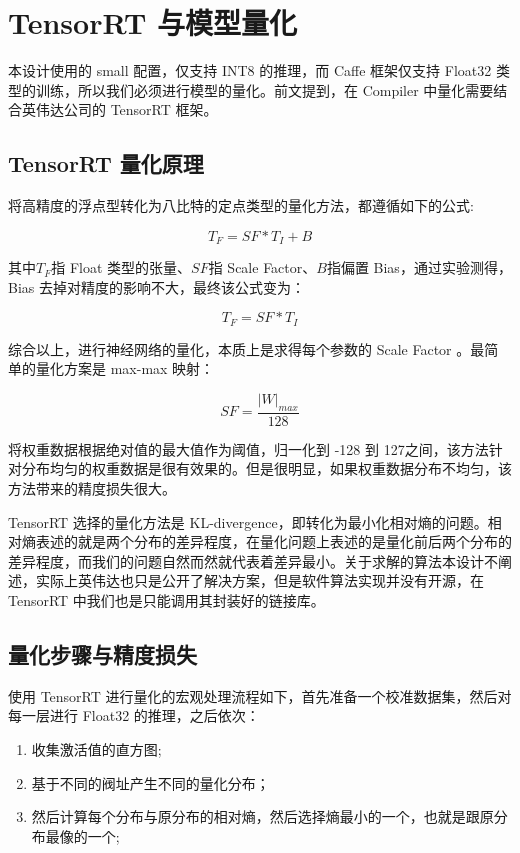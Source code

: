 \section{TensorRT 与模型量化}

本设计使用的 small 配置，仅支持 INT8 的推理，而 Caffe 框架仅支持 Float32 类型的训练，所以我们必须进行模型的量化。前文提到，在 Compiler 中量化需要结合英伟达公司的 TensorRT 框架。

\subsection{TensorRT 量化原理}

将高精度的浮点型转化为八比特的定点类型的量化方法，都遵循如下的公式:

$$ T_F = SF * T_I + B $$


其中$T_F$指 Float 类型的张量、$SF$指 Scale Factor、$B$指偏置 Bias，通过实验测得，Bias 去掉对精度的影响不大，最终该公式变为：

$$ T_F = SF * T_I $$

综合以上，进行神经网络的量化，本质上是求得每个参数的 Scale Factor 。最简单的量化方案是 max-max 映射：

$$ SF = \frac{|W|_{max}}{128} $$

将权重数据根据绝对值的最大值作为阈值，归一化到 -128 到 127之间，该方法针对分布均匀的权重数据是很有效果的。但是很明显，如果权重数据分布不均匀，该方法带来的精度损失很大。

TensorRT 选择的量化方法是 KL-divergence，即转化为最小化相对熵的问题\cite{shen2019highly}。相对熵表述的就是两个分布的差异程度，在量化问题上表述的是量化前后两个分布的差异程度，而我们的问题自然而然就代表着差异最小。关于求解的算法本设计不阐述，实际上英伟达也只是公开了解决方案，但是软件算法实现并没有开源，在 TensorRT 中我们也是只能调用其封装好的链接库。

\subsection{量化步骤与精度损失}

使用 TensorRT 进行量化的宏观处理流程如下，首先准备一个校准数据集，然后对每一层进行 Float32 的推理，之后依次：

\begin{enumerate}
    \item 收集激活值的直方图;
    \item 基于不同的阀址产生不同的量化分布；
    \item 然后计算每个分布与原分布的相对熵，然后选择熵最小的一个，也就是跟原分布最像的一个;
\end{enumerate}

